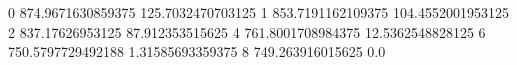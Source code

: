 0 874.9671630859375 125.7032470703125
1 853.7191162109375 104.4552001953125
2 837.17626953125 87.912353515625
4 761.8001708984375 12.5362548828125
6 750.5797729492188 1.31585693359375
8 749.263916015625 0.0
